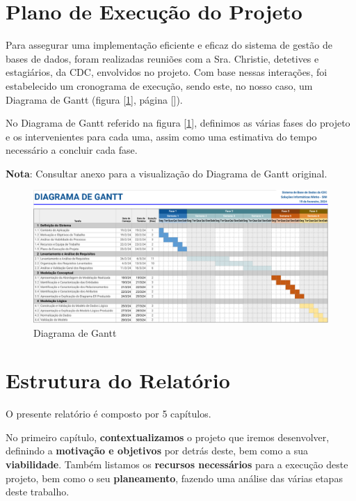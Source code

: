 \documentclass[a4paper,12pt]{scrreprt}
\begin{document}
    \section{Plano de Execução do Projeto}
        Para assegurar uma implementação eficiente e eficaz do sistema de gestão de bases de dados, foram realizadas reuniões com a Sra$.$ Christie, detetives e estagiários, da CDC, envolvidos no projeto. Com base nessas interações, foi estabelecido um cronograma de execução, sendo este, no nosso caso, um Diagrama de Gantt (figura [\ref{fig:1.1}], página [\pageref{fig:1.1}]).

        No Diagrama de Gantt referido na figura [\ref{fig:1.1}], definimos as várias fases do projeto e os intervenientes para cada uma, assim como uma estimativa do tempo necessário a concluir cada fase.
        
        \textbf{Nota}: Consultar anexo  para a visualização do Diagrama de Gantt original.
        \begin{figure}
            \centering
            \includegraphics[scale=0.99, angle=270]{images/gantt.pdf}
            \caption{Diagrama de Gantt}
            \label{fig:1.1}
        \end{figure}


    \clearpage
    
    \section{Estrutura do Relatório}
    O presente relatório é composto por 5 capítulos.
    
    No primeiro capítulo, \textbf{contextualizamos} o projeto que iremos desenvolver, definindo a \textbf{motivação e objetivos} por detrás deste, bem como a sua \textbf{viabilidade}. Também listamos os \textbf{recursos necessários} para a execução deste projeto, bem como o seu \textbf{planeamento}, fazendo uma análise das várias etapas deste trabalho.
\end{document}
